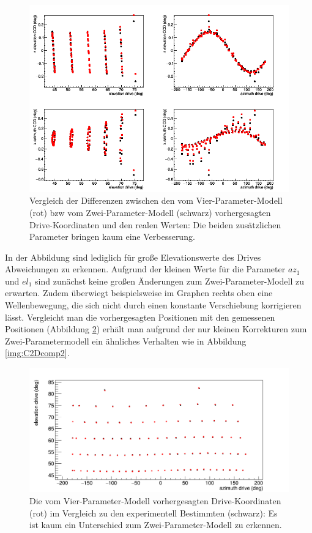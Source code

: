 \begin{figure}[htbp]
\centering
\includegraphics[width=\textwidth]{../341/C2D44comp.png}
\caption{Vergleich der Differenzen zwischen den vom Vier-Parameter-Modell (rot) bzw vom Zwei-Parameter-Modell (schwarz) vorhergesagten Drive-Koordinaten und den realen Werten: Die beiden zusätzlichen Parameter bringen kaum eine Verbesserung.}
\label{img:C2D4comp}
\end{figure}
In der Abbildung sind lediglich für große Elevationswerte des Drives Abweichungen zu erkennen. Aufgrund der kleinen Werte für die Parameter $az_1$ und $el_1$ sind zunächst keine großen Änderungen zum Zwei-Parameter-Modell zu erwarten. Zudem überwiegt beispielsweise im Graphen rechts oben eine Wellenbewegung, die sich nicht durch einen konstante Verschiebung korrigieren lässt. Vergleicht man die vorhergesagten Positionen mit den gemessenen Positionen (Abbildung \ref{img:C2D4comp2}) erhält man aufgrund der nur kleinen Korrekturen zum Zwei-Parametermodell ein ähnliches Verhalten wie in Abbildung \ref{img:C2Dcomp2}.
\begin{figure}[htbp]
\centering
\includegraphics[width=\textwidth]{../341/C2D4comp2.png}
\caption{Die vom Vier-Parameter-Modell vorhergesagten Drive-Koordinaten (rot) im Vergleich zu den experimentell Bestimmten (schwarz): Es ist kaum ein Unterschied zum Zwei-Parameter-Modell zu erkennen.}
\label{img:C2D4comp2}
\end{figure}

